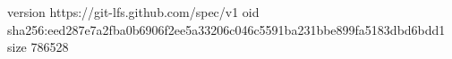 version https://git-lfs.github.com/spec/v1
oid sha256:eed287e7a2fba0b6906f2ee5a33206c046c5591ba231bbe899fa5183dbd6bdd1
size 786528
